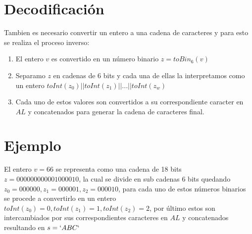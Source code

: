 \documentclass[a4paper,10pt]{article}
\begin{document}
\section{Decodificación}
Tambien es necesario convertir un entero a una cadena de caracteres y para esto se realiza el proceso inverso:
\begin{enumerate}
 \item El entero $v$ es convertido en un número binario  $z=toBin_6(v)$ 
 \item Separamo $z$ en cadenas de 6 bits y cada una de ellas la interpretamos como un entero $toInt(z_0)||toInt(z_1)||...||toInt(z_w)$
 \item Cada uno de estos valores son convertidos a su correspondiente caracter en $AL$ y concatenados para generar la cadena de caracteres final.
\end{enumerate}

\section{Ejemplo}
El entero $v=66$ se representa como una cadena de 18 bits $z=000000000001000010$, la cual se divide en sub cadenas 6 bits quedando $z_0=000000, z_1=000001, z_2=000010$, para cada uno de estos números binarios se procede a convertirlo en un entero $toInt(z_0)=0, toInt(z_1)=1, toInt(z_2)=2$, por último estos son intercambiados por sus correspondientes caracteres en $AL$ y concatenados resultando en $s=`ABC`$
\end{document}
